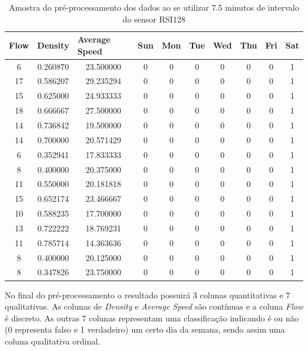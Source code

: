 \begin{table}[H]
    \begin{tabular}{cccccccccc}
    \toprule
    \multicolumn{1}{l}{\textbf{Flow}} & \multicolumn{1}{l}{\textbf{Density}} & \multicolumn{1}{l}{\textbf{Average Speed}} & \multicolumn{1}{l}{\textbf{Sun}} &
    \multicolumn{1}{l}{\textbf{Mon}} & \multicolumn{1}{l}{\textbf{Tue}} & \multicolumn{1}{l}{\textbf{Wed}} & \multicolumn{1}{l}{\textbf{Thu}} &
    \multicolumn{1}{l}{\textbf{Fri}} &
    \multicolumn{1}{l}{\textbf{Sat}} \\
    \midrule
     6 & 0.260870 & 23.500000 & 0 & 0 & 0 & 0 & 0 & 0 & 1 \\
    \midrule
    17 & 0.586207 & 29.235294 & 0 & 0 & 0 & 0 & 0 & 0 & 1 \\
    \midrule
    15 & 0.625000 & 24.933333 & 0 & 0 & 0 & 0 & 0 & 0 & 1 \\
    \midrule
    18 & 0.666667 & 27.500000 & 0 & 0 & 0 & 0 & 0 & 0 & 1 \\
    \midrule
    14 & 0.736842 & 19.500000 & 0 & 0 & 0 & 0 & 0 & 0 & 1 \\
    \midrule
    14 & 0.700000 & 20.571429 & 0 & 0 & 0 & 0 & 0 & 0 & 1 \\
    \midrule
     6 & 0.352941 & 17.833333 & 0 & 0 & 0 & 0 & 0 & 0 & 1 \\
    \midrule
     8 & 0.400000 & 20.375000 & 0 & 0 & 0 & 0 & 0 & 0 & 1 \\
    \midrule
    11 & 0.550000 & 20.181818 & 0 & 0 & 0 & 0 & 0 & 0 & 1 \\
    \midrule
    15 & 0.652174 & 23.466667 & 0 & 0 & 0 & 0 & 0 & 0 & 1 \\
    \midrule
    10 & 0.588235 & 17.700000 & 0 & 0 & 0 & 0 & 0 & 0 & 1 \\
    \midrule
    13 & 0.722222 & 18.769231 & 0 & 0 & 0 & 0 & 0 & 0 & 1 \\
    \midrule
    11 & 0.785714 & 14.363636 & 0 & 0 & 0 & 0 & 0 & 0 & 1 \\
    \midrule
     8 & 0.400000 & 20.125000 & 0 & 0 & 0 & 0 & 0 & 0 & 1 \\
    \midrule
     8 & 0.347826 & 23.750000 & 0 & 0 & 0 & 0 & 0 & 0 & 1 \\
    \bottomrule
    \end{tabular}
    \label{table:data_pre}
    \caption{Amostra do pré-processamento dos dados ao se utilizar 7.5 minutos de intervalo do sensor RSI128}
\end{table}

No final do pré-processamento o resultado possuirá 3 colunas quantitativas e 7 qualitativas. As colunas de \textit{Density} e \textit{Average Speed} são contínuas e a coluna \textit{Flow} é discreto. As outras 7 colunas representam uma classificação indicando é ou não (0 representa falso e 1 verdadeiro) um certo dia da semana, sendo assim uma coluna qualitativa ordinal.

